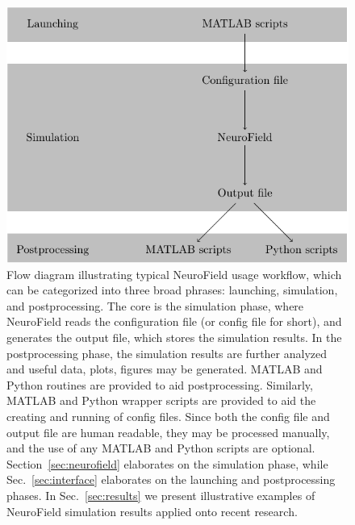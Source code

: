 \documentclass[preprint,review,10pt,authoryear,letterpaper]{elsarticle}
\begin{document}
\begin{figure}[h!t]
\begin{center}
\includegraphics[scale=.8]{flow.pdf}
\caption{Flow diagram illustrating typical NeuroField usage workflow, which can be categorized into three broad phrases: launching, simulation, and postprocessing. The core is the simulation phase, where NeuroField reads the configuration file (or config file for short), and generates the output file, which stores the simulation results. In the postprocessing phase, the simulation results are further analyzed and useful data, plots, figures may be generated. MATLAB and Python routines are provided to aid postprocessing. Similarly, MATLAB and Python wrapper scripts are provided to aid the creating and running of config files. Since both the config file and output file are human readable, they may be processed manually, and the use of any MATLAB and Python scripts are optional. Section~\ref{sec:neurofield} elaborates on the simulation phase, while Sec.~\ref{sec:interface} elaborates on the launching and postprocessing phases. In Sec.~\ref{sec:results} we present illustrative examples of NeuroField simulation results applied onto recent research.}
\label{fig:workflow}
\end{center}
\end{figure}
\end{document}
